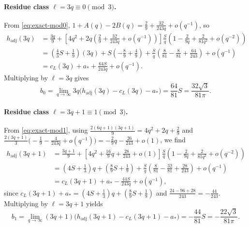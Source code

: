 \documentclass[11pt,a4paper]{article}
\numberwithin{equation}{section}
\theoremstyle{plain}
\theoremstyle{definition}
\theoremstyle{remark}
\newcommand{\hadj}{h_{\mathrm{adj}}}
\begin{document}
\paragraph{Residue class $\ell = 3q \equiv 0 \pmod 3$.}
From \eqref{eq:exact-mod0}, $1+A(q)-2B(q) = \frac{2}{9} + \frac{32}{243q} + o(q^{-1})$, so
\begin{align*}
  \hadj(3q)
  &= \frac{3q}{9}
   + \left[4q^2 + 2q\left(\frac{2}{9} + \frac{32}{243q} + o(q^{-1})\right)\right]
     \frac{S}{q}\left(1 - \frac{2}{9q} + \frac{2}{81q^2} + o(q^{-2})\right)\\
  &= \left(\frac{4}{3}S+\frac{1}{9}\right)(3q)
   + S\left(-\frac{8}{9} + \frac{4}{9}\right)
   + \frac{S}{q}\left(\frac{8}{81} - \frac{8}{81} + \frac{64}{243}\right)
   + o(q^{-1})\\
  &= c_L(3q) + a_* + \frac{64S}{243q} + o(q^{-1}).
\end{align*}
Multiplying by $\ell=3q$ gives
\[
  b_0 = \lim_{q\to\infty} 3q\bigl(\hadj(3q) - c_L(3q) - a_*\bigr)
      = \frac{64}{81}S = \frac{32\sqrt{3}}{81\pi}.
\]

\paragraph{Residue class $\ell = 3q+1 \equiv 1 \pmod 3$.}
From \eqref{eq:exact-mod1}, using $\frac{2(6q+1)(3q+1)}{9} = 4q^2 + 2q + \frac{2}{9}$ and $\frac{2(3q+1)}{3}\bigl(-\frac{1}{9}-\frac{4}{243q}+o(q^{-1})\bigr) = -\frac{2}{9}q - \frac{26}{243} + o(1)$, we find
\begin{align*}
  \hadj(3q+1)
  &= \frac{3q+1}{9}
   + \left[4q^2 + \frac{16}{9}q + \frac{28}{243} + o(1)\right]
     \frac{S}{q}\left(1 - \frac{2}{9q} + \frac{2}{81q^2} + o(q^{-2})\right)\\
  &= \left(4S+\frac{1}{3}\right)q + \left(\frac{8}{9}S + \frac{1}{9}\right)
   + \frac{S}{q}\left(\frac{8}{81} - \frac{32}{81} + \frac{28}{243}\right) + o(q^{-1})\\
  &= c_L(3q+1) + a_* - \frac{44S}{243q} + o(q^{-1}),
\end{align*}
since $c_L(3q+1)+a_* = (4S+\frac{1}{3})q + (\frac{8}{9}S+\frac{1}{9})$ and $\frac{24-96+28}{243} = -\frac{44}{243}$. Multiplying by $\ell=3q+1$ yields
\[
  b_1 = \lim_{q\to\infty}(3q+1)\bigl(\hadj(3q+1) - c_L(3q+1) - a_*\bigr)
      = -\frac{44}{81}S = -\frac{22\sqrt{3}}{81\pi}.
\]
\end{document}
